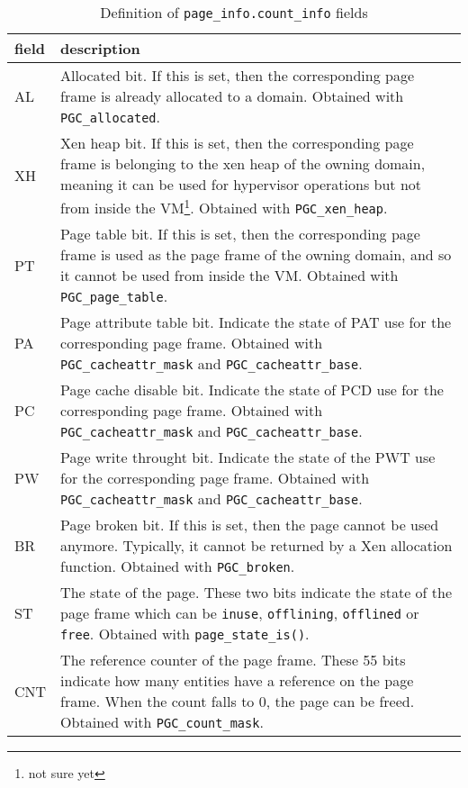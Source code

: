 \begin{table}
  \centering
  \begin{tabularx}{\textwidth}{ | l | X | }
    \hline
    field   & description \\
    \hline
    AL      & Allocated bit. If this is set, then the corresponding page frame
              is already allocated to a domain. Obtained with
              \texttt{PGC\_allocated}. \\
    \hline
    XH      & Xen heap bit. If this is set, then the corresponding page frame
              is belonging to the xen heap of the owning domain, meaning it
              can be used for hypervisor operations but not from inside the
              VM\footnote{not sure yet}. Obtained with
              \texttt{PGC\_xen\_heap}. \\
    \hline
    PT      & Page table bit. If this is set, then the corresponding page frame
              is used as the page frame of the owning domain, and so it cannot
              be used from inside the VM. Obtained with
              \texttt{PGC\_page\_table}. \\
    \hline
    PA      & Page attribute table bit. Indicate the state of PAT use for the
              corresponding page frame. Obtained with
              \texttt{PGC\_cacheattr\_mask} and
              \texttt{PGC\_cacheattr\_base}. \\
    \hline
    PC      & Page cache disable bit. Indicate the state of PCD use for the
              corresponding page frame. Obtained with
              \texttt{PGC\_cacheattr\_mask} and
              \texttt{PGC\_cacheattr\_base}. \\
    \hline
    PW      & Page write throught bit. Indicate the state of the PWT use for
              the corresponding page frame. Obtained with
              \texttt{PGC\_cacheattr\_mask} and
              \texttt{PGC\_cacheattr\_base}. \\
    \hline
    BR      & Page broken bit. If this is set, then the page cannot be used
              anymore. Typically, it cannot be returned by a Xen allocation
              function. Obtained with \texttt{PGC\_broken}. \\
    \hline
    ST      & The state of the page. These two bits indicate the state of the
              page frame which can be \texttt{inuse}, \texttt{offlining},
              \texttt{offlined} or \texttt{free}. Obtained with
              \texttt{page\_state\_is()}. \\
    \hline
    CNT     & The reference counter of the page frame. These 55 bits indicate
              how many entities have a reference on the page frame. When the
              count falls to 0, the page can be freed. Obtained with
              \texttt{PGC\_count\_mask}. \\
    \hline
  \end{tabularx}
  \caption{\label{table page_info.count_info}Definition of
    \texttt{page\_info.count\_info} fields}
\end{table}

